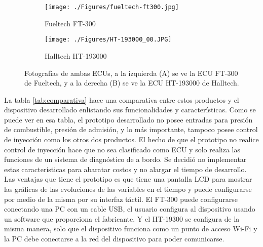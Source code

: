 \begin{figure}[htpb]
\centering
\begin{subfigure}{.4\textwidth}
\centering
\texttt{[image: ./Figures/fueltech-ft300.jpg]}
\caption{Fueltech FT-300}
\label{fig:fueltech}
\end{subfigure}
\hfill
\begin{subfigure}{.5\textwidth}
\centering
\texttt{[image: ./Figures/HT-193000\_00.JPG]}
\caption{Halltech HT-193000}
\label{fig:halltech}
\end{subfigure}
\caption{Fotografías de ambas ECUs, a la izquierda (A) se ve la ECU FT-300 de Fueltech, y a la derecha (B) se ve la ECU HT-193000 de Halltech.\protect\footnotemark[1]}
\label{fig:comparativa}
\end{figure}

La tabla \ref{tab:comparativa} hace una comparativa entre estos productos y el dispositivo desarrollado enlistando sus funcionalidades y características.  Como se puede ver en esa tabla, el prototipo desarrollado no posee entradas para presión de combustible, presión de admisión, y lo más importante, tampoco posee control de inyección como los otros dos productos. El hecho de que el prototipo no realice control de inyección hace que no sea clasificado como ECU y solo realiza las funciones de un sistema de diagnóstico de a bordo. Se decidió no implementar estas características para abaratar costos y no alargar el tiempo de desarrollo. Las ventajas que tiene el prototipo es que tiene una pantalla LCD para mostrar las gráficas de las evoluciones de las variables en el tiempo y puede configurarse por medio de la misma por su interfaz táctil. El FT-300 puede configurarse conectando una PC con un cable USB, el usuario configura al dispositivo usando un software que proporciona el fabricante. Y el HT-19300 se configura de la misma manera, solo que el dispositivo funciona como un punto de acceso Wi-Fi y la PC debe conectarse a la red del dispositivo para poder comunicarse.

